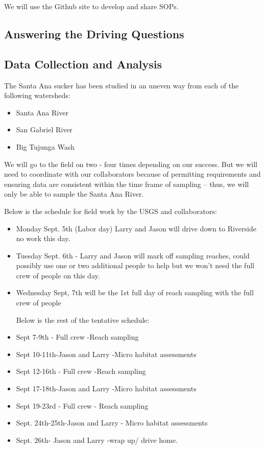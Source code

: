 \documentclass{tufte-handout}\usepackage[]{graphicx}\usepackage[]{color}
\begin{document}
We will use the Github site to develop and share SOPs.

\subsection{Answering the Driving Questions}


\subsection{Data Collection and Analysis}

The Santa Ana sucker has been studied in an uneven way from each of the following watersheds: 

\begin{itemize}
  \item Santa Ana River
  \item San Gabriel River
  \item Big Tujunga Wash
\end{itemize}

We will go to the field on two - four times depending on our success. But we will need to coordinate with our collaborators because of permitting requirements and ensuring data are consistent within the time frame of sampling -- thus, we will only be able to sample the Santa Ana River.

Below is the schedule for field work by the USGS and collaborators:

\begin{itemize}
\item Monday Sept. 5th (Labor day) Larry and Jason will drive down to Riverside no work this day.
\item Tuesday Sept. 6th - Larry and Jason will mark off sampling reaches, could possibly use one or two additional people to help but we won't need the full crew of people on this day. 
\item Wednesday Sept, 7th will be the 1st full day of reach sampling with the full crew of people

Below is the rest of the tentative schedule:

\item Sept 7-9th - Full crew -Reach sampling
\item Sept 10-11th-Jason and Larry -Micro habitat assessments
\item Sept 12-16th - Full crew -Reach sampling
\item Sept 17-18th-Jason and Larry -Micro habitat assessments

\item Sept 19-23rd - Full crew - Reach sampling
\item Sept. 24th-25th-Jason and Larry - Micro habitat assessments
\item Sept. 26th- Jason and Larry -wrap up/ drive home.
\end{itemize}
\end{document}
